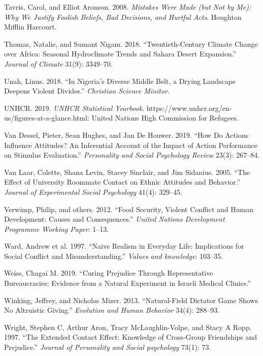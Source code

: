 \documentclass[11pt]{article}
\begin{document}
\begin{cslreferences}
\leavevmode\hypertarget{ref-tavris2008mistakes}{}%
Tavris, Carol, and Elliot Aronson. 2008. \emph{Mistakes Were Made (but
Not by Me): Why We Justify Foolish Beliefs, Bad Decisions, and Hurtful
Acts}. Houghton Mifflin Harcourt.

\leavevmode\hypertarget{ref-thomas2018sahara}{}%
Thomas, Natalie, and Sumant Nigam. 2018. ``Twentieth-Century Climate
Change over Africa: Seasonal Hydroclimate Trends and Sahara Desert
Expansion.'' \emph{Journal of Climate} 31(9): 3349--70.

\leavevmode\hypertarget{ref-unah2018nigeria}{}%
Unah, Linus. 2018. ``In Nigeria's Diverse Middle Belt, a Drying
Landscape Deepens Violent Divides.'' \emph{Christian Science Minitor}.

\leavevmode\hypertarget{ref-unhcr2019}{}%
UNHCR. 2019. \emph{UNHCR Statistical Yearbook}.
https://www.unhcr.org/en-us/figures-at-a-glance.html: United Nations
High Commission for Refugees.

\leavevmode\hypertarget{ref-van2019actions}{}%
Van Dessel, Pieter, Sean Hughes, and Jan De Houwer. 2019. ``How Do
Actions Influence Attitudes? An Inferential Account of the Impact of
Action Performance on Stimulus Evaluation.'' \emph{Personality and
Social Psychology Review} 23(3): 267--84.

\leavevmode\hypertarget{ref-van2005effect}{}%
Van Laar, Colette, Shana Levin, Stacey Sinclair, and Jim Sidanius. 2005.
``The Effect of University Roommate Contact on Ethnic Attitudes and
Behavior.'' \emph{Journal of Experimental Social Psychology} 41(4):
329--45.

\leavevmode\hypertarget{ref-verwimp2012food}{}%
Verwimp, Philip, and others. 2012. ``Food Security, Violent Conflict and
Human Development: Causes and Consequences.'' \emph{United Nations
Development Programme Working Paper}: 1--13.

\leavevmode\hypertarget{ref-ward1997naive}{}%
Ward, Andrew et al. 1997. ``Naive Realism in Everyday Life: Implications
for Social Conflict and Misunderstanding.'' \emph{Values and knowledge}:
103--35.

\leavevmode\hypertarget{ref-weiss2019curing}{}%
Weiss, Chagai M. 2019. ``Curing Prejudice Through Representative
Bureaucracies: Evidence from a Natural Experiment in Israeli Medical
Clinics.''

\leavevmode\hypertarget{ref-winking2013natural}{}%
Winking, Jeffrey, and Nicholas Mizer. 2013. ``Natural-Field Dictator
Game Shows No Altruistic Giving.'' \emph{Evolution and Human Behavior}
34(4): 288--93.

\leavevmode\hypertarget{ref-wright1997extended}{}%
Wright, Stephen C, Arthur Aron, Tracy McLaughlin-Volpe, and Stacy A
Ropp. 1997. ``The Extended Contact Effect: Knowledge of Cross-Group
Friendships and Prejudice.'' \emph{Journal of Personality and Social
psychology} 73(1): 73.
\end{cslreferences}
\end{document}
